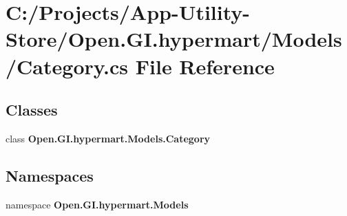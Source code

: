 \section{C\+:/\+Projects/\+App-\/\+Utility-\/\+Store/\+Open.G\+I.\+hypermart/\+Models/\+Category.cs File Reference}
\label{_category_8cs}
\subsection*{Classes}
\begin{DoxyCompactItemize}
\item 
class \textbf{ Open.\+G\+I.\+hypermart.\+Models.\+Category}
\end{DoxyCompactItemize}
\subsection*{Namespaces}
\begin{DoxyCompactItemize}
\item 
namespace \textbf{ Open.\+G\+I.\+hypermart.\+Models}
\end{DoxyCompactItemize}
